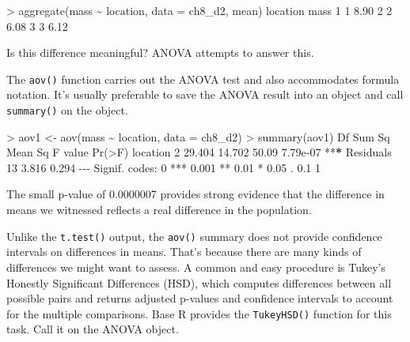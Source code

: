 \documentclass[
]{book}
\newenvironment{Shaded}{\begin{snugshade}}{\end{snugshade}}
\newcommand{\AttributeTok}[1]{\textcolor[rgb]{0.77,0.63,0.00}{#1}}
\newcommand{\DecValTok}[1]{\textcolor[rgb]{0.00,0.00,0.81}{#1}}
\newcommand{\ErrorTok}[1]{\textcolor[rgb]{0.64,0.00,0.00}{\textbf{#1}}}
\newcommand{\FloatTok}[1]{\textcolor[rgb]{0.00,0.00,0.81}{#1}}
\newcommand{\FunctionTok}[1]{\textcolor[rgb]{0.00,0.00,0.00}{#1}}
\newcommand{\NormalTok}[1]{#1}
\newcommand{\OtherTok}[1]{\textcolor[rgb]{0.56,0.35,0.01}{#1}}
\newcommand{\SpecialCharTok}[1]{\textcolor[rgb]{0.00,0.00,0.00}{#1}}
\newcommand{\StringTok}[1]{\textcolor[rgb]{0.31,0.60,0.02}{#1}}
\begin{document}
\begin{Shaded}
\begin{Highlighting}[]
\SpecialCharTok{\textgreater{}} \FunctionTok{aggregate}\NormalTok{(mass }\SpecialCharTok{\textasciitilde{}}\NormalTok{ location, }\AttributeTok{data =}\NormalTok{ ch8\_d2, mean)}
\NormalTok{  location mass}
\DecValTok{1}        \DecValTok{1} \FloatTok{8.90}
\DecValTok{2}        \DecValTok{2} \FloatTok{6.08}
\DecValTok{3}        \DecValTok{3} \FloatTok{6.12}
\end{Highlighting}
\end{Shaded}

Is this difference meaningful? ANOVA attempts to answer this.

The \texttt{aov()} function carries out the ANOVA test and also accommodates formula notation. It's usually preferable to save the ANOVA result into an object and call \texttt{summary()} on the object.

\begin{Shaded}
\begin{Highlighting}[]
\SpecialCharTok{\textgreater{}}\NormalTok{ aov1 }\OtherTok{\textless{}{-}} \FunctionTok{aov}\NormalTok{(mass }\SpecialCharTok{\textasciitilde{}}\NormalTok{ location, }\AttributeTok{data =}\NormalTok{ ch8\_d2)}
\SpecialCharTok{\textgreater{}} \FunctionTok{summary}\NormalTok{(aov1)}
\NormalTok{            Df Sum Sq Mean Sq F value   }\FunctionTok{Pr}\NormalTok{(}\SpecialCharTok{\textgreater{}}\NormalTok{F)    }
\NormalTok{location     }\DecValTok{2} \FloatTok{29.404}  \FloatTok{14.702}   \FloatTok{50.09} \FloatTok{7.79e{-}07} \SpecialCharTok{**}\ErrorTok{*}
\NormalTok{Residuals   }\DecValTok{13}  \FloatTok{3.816}   \FloatTok{0.294}                     
\SpecialCharTok{{-}{-}{-}}
\NormalTok{Signif. codes}\SpecialCharTok{:}  \DecValTok{0} \StringTok{\textquotesingle{}***\textquotesingle{}} \FloatTok{0.001} \StringTok{\textquotesingle{}**\textquotesingle{}} \FloatTok{0.01} \StringTok{\textquotesingle{}*\textquotesingle{}} \FloatTok{0.05} \StringTok{\textquotesingle{}.\textquotesingle{}} \FloatTok{0.1} \StringTok{\textquotesingle{} \textquotesingle{}} \DecValTok{1}
\end{Highlighting}
\end{Shaded}

The small p-value of 0.0000007 provides strong evidence that the difference in means we witnessed reflects a real difference in the population.

Unlike the \texttt{t.test()} output, the \texttt{aov()} summary does not provide confidence intervals on differences in means. That's because there are many kinds of differences we might want to assess. A common and easy procedure is Tukey's Honestly Significant Differences (HSD), which computes differences between all possible pairs and returns adjusted p-values and confidence intervals to account for the multiple comparisons. Base R provides the \texttt{TukeyHSD()} function for this task. Call it on the ANOVA object.
\end{document}
